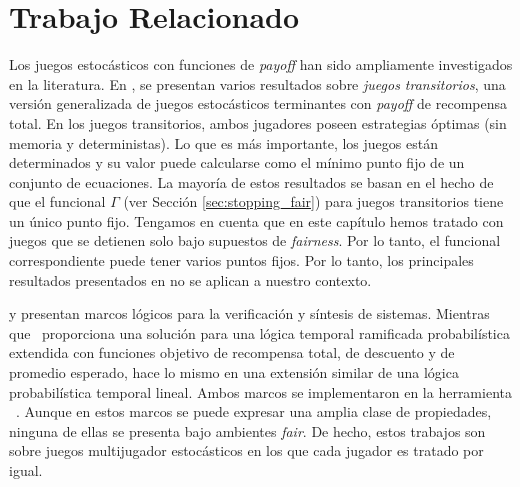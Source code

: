 \section{Trabajo Relacionado} \label{sec:related_work_fair}

Los juegos estocásticos con funciones de \textit{payoff} han sido ampliamente investigados en la literatura. En \cite{FilarV96}, se presentan varios resultados sobre \emph{juegos transitorios},
una versión generalizada de juegos estocásticos terminantes con \textit{payoff} de recompensa total.
En los juegos transitorios, ambos jugadores poseen estrategias óptimas (sin memoria y deterministas).
Lo que es más importante, los juegos están determinados y su valor puede calcularse como el mínimo punto fijo de un conjunto de ecuaciones.
La mayoría de estos resultados se basan en el hecho de que el funcional $\Gamma$ (ver Sección \ref{sec:stopping_fair}) para juegos transitorios tiene un único punto fijo.
Tengamos en cuenta que en este capítulo hemos tratado con juegos que se detienen solo bajo supuestos de \textit{fairness}. Por lo tanto, el funcional correspondiente
puede tener varios puntos fijos. Por lo tanto, los principales resultados presentados en \cite{FilarV96} no se aplican a nuestro contexto.

\cite{DBLP:journals/fmsd/ChenFKPS13} y \cite{SvorenovaKwiatkowska16} presentan marcos lógicos para la verificación y síntesis de sistemas. Mientras que~\cite{DBLP:journals/fmsd/ChenFKPS13} proporciona una solución para una lógica temporal ramificada probabilística extendida con funciones objetivo de recompensa total, de descuento y de promedio esperado, \cite{SvorenovaKwiatkowska16} hace lo mismo en una extensión similar de una lógica probabilística temporal lineal. Ambos marcos se implementaron en la herramienta \Prism~\cite{DBLP:conf/cav/KwiatkowskaN0S20,DBLP:conf/cav/KwiatkowskaNP11}. Aunque en estos marcos se puede expresar una amplia clase de propiedades, ninguna de ellas se presenta bajo ambientes \textit{fair}. De hecho, estos trabajos son sobre juegos multijugador estocásticos en los que cada jugador es tratado por igual.


